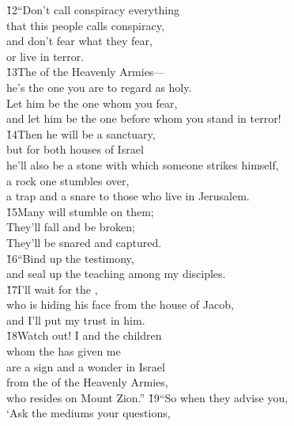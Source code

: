 \begin{poetry}
\poeml \v{12}``Don't call conspiracy everything \\
\poemll    that this people calls conspiracy, \\
\poeml and don't fear what they fear, \\
\poemll    or live in terror. \\
\poeml \v{13}The  of the Heavenly Armies--- \\
\poemll    he's the one you are to regard as holy. \\
\poeml Let him be the one whom you fear, \\
\poemll    and let him be the one before whom you stand in terror! \\
\poeml \v{14}Then he will be a sanctuary, \\
\poemll    but for both houses of Israel \\
\poeml he'll also be a stone with which someone strikes himself, \\
\poemll    a rock one stumbles over, \\
\poemlll       a trap and a snare to those who live in Jerusalem. \\
\poeml \v{15}Many will stumble on them; \\
\poemll    They'll fall and be broken; \\
\poemlll       They'll be snared and captured. \\
\poeml \v{16}``Bind up the testimony, \\
\poemll    and seal up the teaching among my disciples. \\
\poeml \v{17}I'll wait for the , \\
\poemll    who is hiding his face from the house of Jacob, \\
\poemlll       and I'll put my trust in him. \\
\poeml \v{18}Watch out! I and the children \\
\poemll    whom the  has given me \\
\poeml are a sign and a wonder in Israel \\
\poemll    from the  of the Heavenly Armies, \\
\poemlll       who resides on Mount Zion.''
\poeml \v{19}``So when they advise you, \\
\poeml `Ask the mediums your questions, \\

\end{poetry}
